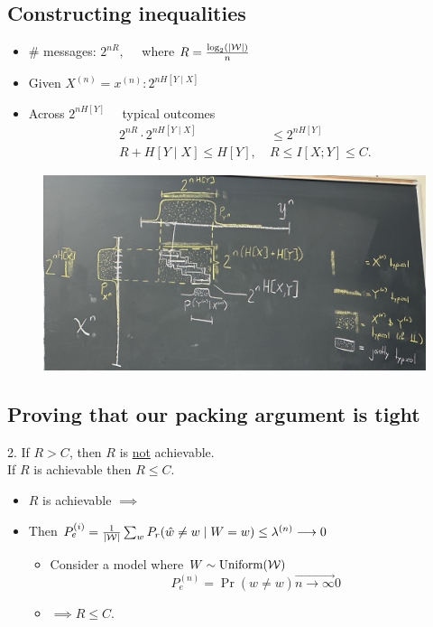 \subsection{Constructing inequalities}
\begin{itemize}
    \item \# messages: $2^{n R}, \quad$ where $R=\frac{\log_2(|\mathcal{W}|)}{n}$
    \item Given $X^{(n)}=x^{(n)}: 2^{n H[Y \mid X]}$
    \item Across $2^{n H[Y]} \quad$ typical outcomes
    \begin{align}
    2^{n R} \cdot 2^{n H[Y \mid X]} 
        &\leq 2^{n H[Y]} \\
    R+H[Y \mid X] \leq H[Y], \ 
    &
    R \leq I[X ; Y] \leq C.
    \end{align}
\end{itemize}

\begin{figure}[h]
    \centering
    \includegraphics[scale=0.1]{lectures/wk13/img/strip.jpg}
    \label{fig:strip_firsttime}
\end{figure}

\subsection{Proving that our packing argument is tight}
2. If $R>C$, then $R$ is \underline{not} achievable.\\
If $R$ is achievable then $R \leq C$.
\begin{itemize}
    \item $R$ is achievable $\implies $
    \item Then $P_e^{(i)}=\frac{1}{|\mathcal{W}|} \sum_w P_r(\hat{w} \neq w \mid W=w) \leq \lambda^{(n)} \longrightarrow 0$
    \begin{itemize}
        \item Consider a model where $W \sim\text{Uniform}({\mathcal{W}})$
    \begin{equation}
    P_e^{(n)}=\operatorname{Pr}(\hat{w} \neq w) 
    \stackrel{\rightarrow}{{n \rightarrow \infty}}
    0
    \end{equation}
        \item $\implies R \leq C$.
    \end{itemize}
\end{itemize}

